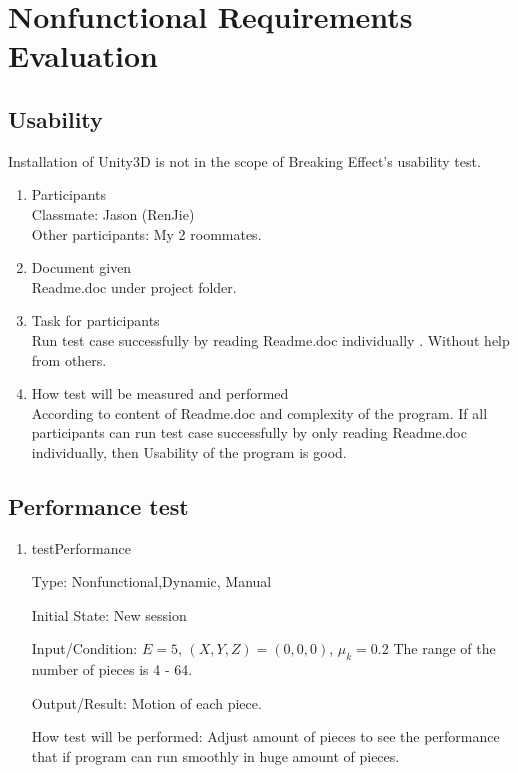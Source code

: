 \documentclass[12pt, titlepage]{article}
\begin{document}
\section{Nonfunctional Requirements Evaluation}

\subsection{Usability}

	Installation of Unity3D is not in the scope of Breaking Effect's usability test.

\begin{enumerate}
	
	\item{Participants\\}
	Classmate: Jason (RenJie)\\
	Other participants: My 2 roommates.
	
	\item{Document given\\}
	Readme.doc under project folder.
	
	\item{Task for participants\\}
	Run test case successfully by reading Readme.doc individually . Without help from
	others.
	
	\item{How test will be measured and performed\\}
	According to content of Readme.doc and complexity of the program. If all participants can run test case successfully by only reading Readme.doc individually, then Usability of the program is good.
	
\end{enumerate}


\subsection{Performance test}

\begin{enumerate}
	
	\item{testPerformance\\}
	
	Type: Nonfunctional,Dynamic, Manual
	
	Initial State: New session
	
	Input/Condition: $E = 5$, $(X,Y,Z) = (0,0,0)$, $\mu_{k} = 0.2$ The range of the number of pieces is 4 - 64.
	
	Output/Result: Motion of each piece.
	
	How test will be performed: Adjust amount of pieces to see the performance that if program can run smoothly in huge amount of pieces.
	
\end{enumerate}
\end{document}
